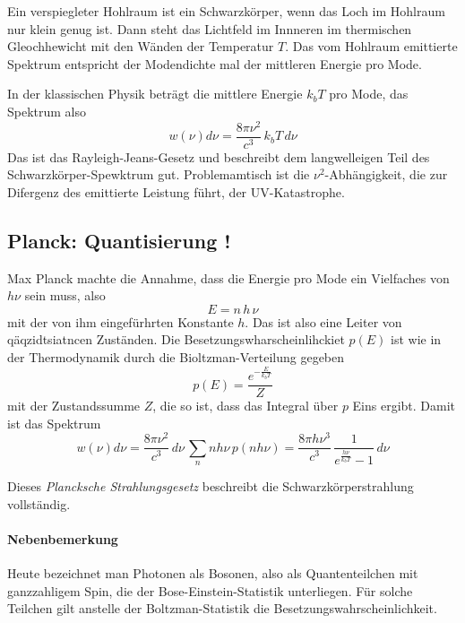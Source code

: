 Ein verspiegleter Hohlraum ist ein Schwarzkörper, wenn das Loch im Hohlraum nur klein genug ist. Dann steht das Lichtfeld im Innneren im thermischen Gleochhewicht mit den Wänden der Temperatur $T$. Das vom Hohlraum emittierte Spektrum entspricht der Modendichte mal der mittleren Energie pro Mode.

In der klassischen Physik beträgt die mittlere Energie $k_b T$ pro Mode, das Spektrum also 
\begin{equation}
    w(\nu) d\nu = \frac{8 \pi \nu^2}{c^3} \, k_b T \, d\nu
\end{equation}
Das ist das Rayleigh-Jeans-Gesetz und beschreibt dem langwelleigen Teil des  Schwarzkörper-Spewktrum gut. Problemamtisch ist die $\nu^2$-Abhängigkeit, die zur Difergenz des emittierte Leistung führt, der UV-Katastrophe.


\subsection{Planck: Quantisierung !}

Max Planck machte die Annahme, dass die Energie pro Mode ein Vielfaches von $h \nu$ sein muss, also 
\begin{equation}
    E = n \, h \, \nu
\end{equation}
mit der von ihm eingefürhrten Konstante $h$. Das ist also eine Leiter von qäqzidtsiatncen Zuständen. Die Besetzungswharscheinlihckiet $p(E)$ ist wie in der Thermodynamik durch die Bioltzman-Verteilung gegeben
\begin{equation}
    p(E) = \frac{e^{- \frac{E}{k_b T}}}{Z}
\end{equation}
mit der Zustandssumme $Z$, die so ist, dass das Integral über $p$ Eins ergibt. Damit ist das Spektrum 
 \begin{equation}
     w(\nu) d\nu = \frac{8 \pi \nu^2}{c^3} \,  d\nu \, \sum_n n h \nu \, p(n h \nu)
    =  \frac{8 \pi h \nu^3}{c^3} \,  \frac{1}{e^{\frac{h \nu}{k_b T}} -1} \, d\nu 
 \end{equation}

 Dieses \emph{Plancksche Strahlungsgesetz} beschreibt die Schwarzkörperstrahlung vollständig.

 \paragraph*{Nebenbemerkung} Heute bezeichnet man Photonen als Bosonen, also als Quantenteilchen mit ganzzahligem Spin, die der Bose-Einstein-Statistik unterliegen. Für solche Teilchen gilt anstelle der Boltzman-Statistik die Besetzungswahrscheinlichkeit.

